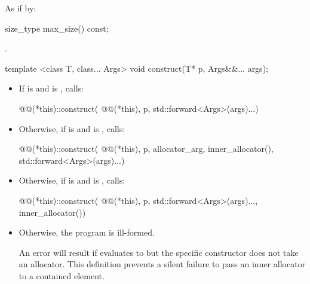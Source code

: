 \begin{itemdescr}
\pnum
\effects As if by:
\end{itemdescr}

%
\begin{itemdecl}
size_type max_size() const;
\end{itemdecl}

\begin{itemdescr}
\pnum
\returns {}.
\end{itemdescr}

%
\begin{itemdecl}
template <class T, class... Args>
  void construct(T* p, Args&&... args);
\end{itemdecl}

\begin{itemdescr}
\pnum
\effects
\begin{itemize}
\item If  is  and
 is , calls:
\begin{codeblock}
@@(*this)::construct(
    @@(*this), p, std::forward<Args>(args)...)
\end{codeblock}

\item Otherwise, if  is  and
 is , calls:
\begin{codeblock}
@@(*this)::construct(
    @@(*this), p, allocator_arg, inner_allocator(), std::forward<Args>(args)...)
\end{codeblock}

\item Otherwise, if  is  and
 is , calls:
\begin{codeblock}
@@(*this)::construct(
    @@(*this), p, std::forward<Args>(args)..., inner_allocator())
\end{codeblock}

\item Otherwise, the program is ill-formed.
\begin{note}
An error will result if
 evaluates to  but the specific constructor does not take an
allocator. This definition prevents a silent failure to pass an inner allocator to a
contained element.
\end{note}
\end{itemize}
\end{itemdescr}

